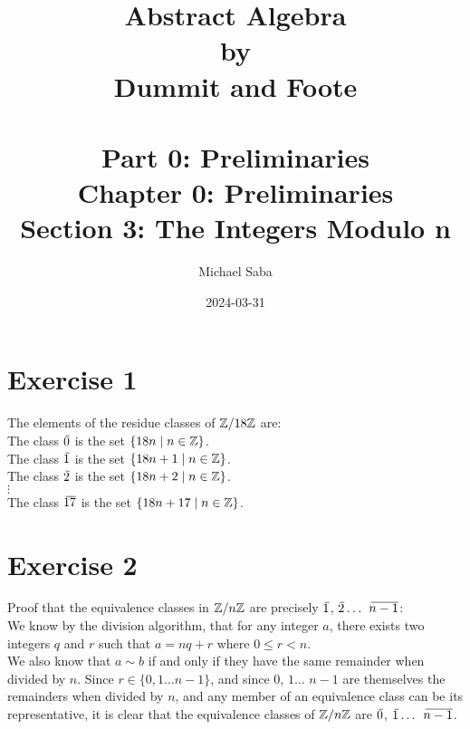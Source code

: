 \documentclass[12pt]{article}
\title{%
    \Huge Abstract Algebra \\
    \large by \\
    \Large Dummit and Foote \\~\\
    \huge Part 0: Preliminaries \\
    \LARGE Chapter 0: Preliminaries \\
    \Large Section 3: The Integers Modulo n
}
\date{2024-03-31}
\author{Michael Saba}
\begin{document}
    \maketitle
    \newpage
    \setlength{\parindent}{0pt}

    \section*{Exercise 1}

    The elements of the residue classes of $\mathbb{Z}/18\mathbb{Z}$ are: \\
    The class $\,\overline{\!{0}}$ is the set $\{ 18n \mid n \in \mathbb{Z} \}$. \\
    The class $\,\overline{\!{1}}$ is the set $\{ 18n + 1 \mid n \in \mathbb{Z} \}$. \\
    The class $\,\overline{\!{2}}$ is the set $\{ 18n + 2 \mid n \in \mathbb{Z} \}$. \\
    $\vdots$ \\
    The class $\,\overline{\!{17}}$ is the set $\{ 18n + 17 \mid n \in \mathbb{Z} \}$. \\

    \section*{Exercise 2}
    Proof that the equivalence classes in $\mathbb{Z}/n\mathbb{Z}$
    are precisely $\,\overline{\!{1}}$, $\,\overline{\!{2}}\dots$ $\,\overline{\!{n-1}}$: \\
    We know by the division algorithm,
    that for any integer $a$, 
    there exists two integers $q$ and $r$
    such that $a = nq + r$ where $0 \leqslant r < n$. \\
    We also know that $a \sim b$ if and only if
    they have the same remainder when divided by $n$.
    Since $r \in \{ 0, 1 \dots n-1 \}$,
    and since $0$, $1\dots$ $n-1$ are themselves the remainders
    when divided by $n$,
    and any member of an equivalence class can be its representative,
    it is clear that the equivalence classes of $\mathbb{Z}/n\mathbb{Z}$
    are $\,\overline{\!{0}}$, $\,\overline{\!{1}}\dots$ $\,\overline{\!{n-1}}$. \\
\end{document}
